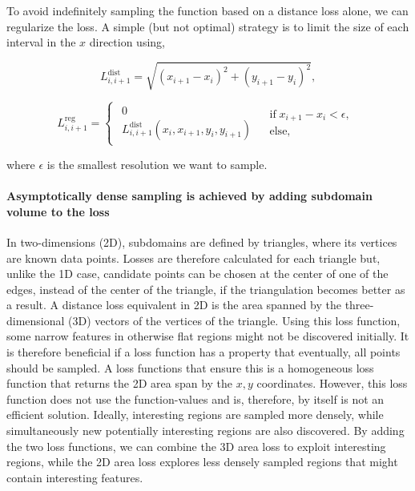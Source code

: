 \documentclass[english, twocolumn, 10pt, aps, superscriptaddress, floatfix, prb, citeautoscript]{revtex4-1}
\begin{document}
To avoid indefinitely sampling the function based on a distance loss alone, we can regularize the loss.
A simple (but not optimal) strategy is to limit the size of each interval in the \(x\) direction using,

\begin{equation*}
L_{i, i+1}^\textrm{dist}=\sqrt{(x_{i+1}-x_{i})^{2}+(y_{i+1}-y_{i})^{2}},
\end{equation*}

\begin{equation*}
L_{i,i+1}^\textrm{reg}=\begin{cases}
\begin{array}{c}
0\\
L_{i, i+1}^\textrm{dist}(x_i, x_{i+1}, y_i, y_{i+1})
\end{array} & \begin{array}{c}
\textrm{if} \; x_{i+1}-x_{i}<\epsilon,\\
\textrm{else,}
\end{array}\end{cases}
\end{equation*}

where \(\epsilon\) is the smallest resolution we want to sample.

\hypertarget{asymptotically-dense-sampling-is-achieved-by-adding-subdomain-volume-to-the-loss}{%
\paragraph{Asymptotically dense sampling is achieved by adding subdomain volume to the loss}\label{asymptotically-dense-sampling-is-achieved-by-adding-subdomain-volume-to-the-loss}}

In two-dimensions (2D), subdomains are defined by triangles, where its vertices are known data points.
Losses are therefore calculated for each triangle but, unlike the 1D case, candidate points can be chosen at the center of one of the edges, instead of the center of the triangle, if the triangulation becomes better as a result.
A distance loss equivalent in 2D is the area spanned by the three-dimensional (3D) vectors of the vertices of the triangle.
Using this loss function, some narrow features in otherwise flat regions might not be discovered initially.
It is therefore beneficial if a loss function has a property that eventually, all points should be sampled.
A loss functions that ensure this is a homogeneous loss function that returns the 2D area span by the \(x, y\) coordinates.
However, this loss function does not use the function-values and is, therefore, by itself is not an efficient solution.
Ideally, interesting regions are sampled more densely, while simultaneously new potentially interesting regions are also discovered.
By adding the two loss functions, we can combine the 3D area loss to exploit interesting regions, while the 2D area loss explores less densely sampled regions that might contain interesting features.
\end{document}
